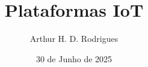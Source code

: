 



\title{Plataformas IoT}

\author[A. Rodrigues]{Arthur H. D. Rodrigues}



\vspace{-2cm}\date{30 de Junho de 2025}

